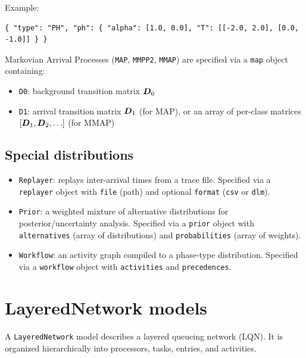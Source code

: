 \noindent Example:
\begin{lstlisting}[basicstyle=\ttfamily\scriptsize]
{ "type": "PH", "ph": { "alpha": [1.0, 0.0], "T": [[-2.0, 2.0], [0.0, -1.0]] } }
\end{lstlisting}

Markovian Arrival Processes (\texttt{MAP}, \texttt{MMPP2}, \texttt{MMAP}) are specified via a \texttt{map} object containing:
\begin{itemize}
\item \texttt{D0}: background transition matrix $\boldsymbol{D}_0$
\item \texttt{D1}: arrival transition matrix $\boldsymbol{D}_1$ (for MAP), or an array of per-class matrices $[\boldsymbol{D}_1, \boldsymbol{D}_2, \ldots]$ (for MMAP)
\end{itemize}

\subsection{Special distributions}
\label{json:dist-special}

\begin{itemize}
\item \texttt{Replayer}: replays inter-arrival times from a trace file. Specified via a \texttt{replayer} object with \texttt{file} (path) and optional \texttt{format} (\texttt{csv} or \texttt{dlm}).
\item \texttt{Prior}: a weighted mixture of alternative distributions for posterior/uncertainty analysis. Specified via a \texttt{prior} object with \texttt{alternatives} (array of distributions) and \texttt{probabilities} (array of weights).
\item \texttt{Workflow}: an activity graph compiled to a phase-type distribution. Specified via a \texttt{workflow} object with \texttt{activities} and \texttt{precedences}.
\end{itemize}

\section{LayeredNetwork models}
\label{json:lqn}

A \texttt{LayeredNetwork} model describes a layered queueing network (LQN). It is organized hierarchically into processors, tasks, entries, and activities.

